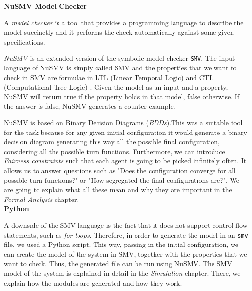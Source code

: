 \documentclass[../main.tex]{subfiles}
\begin{document}
\textbf{NuSMV Model Checker}

A \textit{model checker} is a tool that provides a programming language to describe the model succinctly and it performs the check automatically against some given specifications. 

\textit{NuSMV} is an extended version of the symbolic model checker \verb|SMV|. The input language of NuSMV is simply called SMV and the properties that we want to check in SMV  are formulae in LTL (Linear Temporal Logic)\cite[]{LTL} and CTL (Computational Tree Logic) \cite[]{CTL}. Given the model as an input and a property, NuSMV will return true if the property holds in that model, false otherwise. If the answer is false, NuSMV generates a counter-example.


NuSMV is based on Binary Decision Diagrams (\textit{BDDs}).This was a suitable tool for the task because for any given initial configuration it would generate a binary decision diagram generating this way all the possible final configuration, considering all the possible turn functions. Furthermore, we can introduce \textit{Fairness constraints} such that each agent is going to be picked infinitely often. It allows us to answer questions such as "Does the configuration converge for all possible turn functions?" or "How segregated the final configurations are?". We are going to explain what all these mean and why they are important in the \textit{Formal Analysis} chapter. \\ 

\textbf{Python}

A downside of the SMV language is the fact that it does not support control flow statements, such as  \textit{for-loops}. Therefore, in order to generate the model in an \verb|smv| file, we used a Python \cite[]{Python} script. This way, passing in the initial configuration, we can create the model of the system in SMV, together with the properties that we want to check. Thus, the generated file can be run using NuSMV. The SMV model of the system is explained in detail in the \textit{Simulation} chapter. There, we explain how the modules are generated and how they work.
\end{document}

